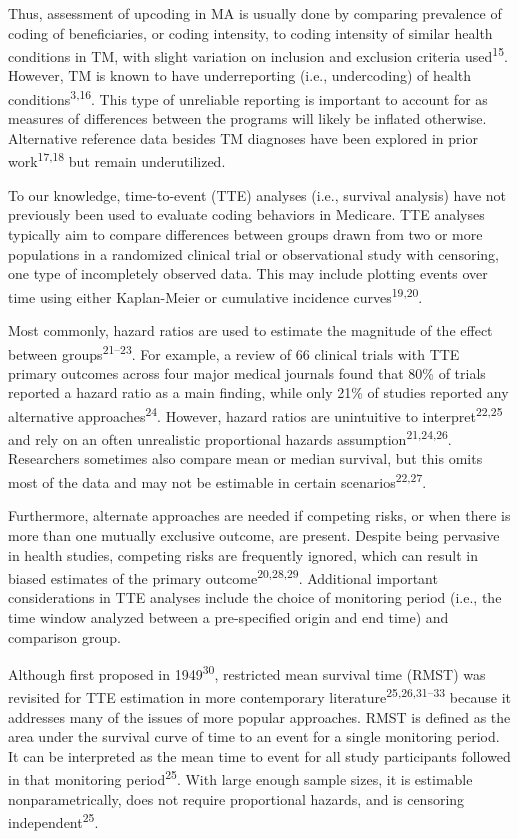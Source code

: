 \documentclass[
  12pt,
  number]{elsarticle}
\begin{document}
Thus, assessment of upcoding in MA is usually done by comparing
prevalence of coding of beneficiaries, or coding intensity, to coding
intensity of similar health conditions in TM, with slight variation on
inclusion and exclusion criteria used\textsuperscript{15}. However, TM
is known to have underreporting (i.e., undercoding) of health
conditions\textsuperscript{3,16}. This type of unreliable reporting is
important to account for as measures of differences between the programs
will likely be inflated otherwise. Alternative reference data besides TM
diagnoses have been explored in prior work\textsuperscript{17,18} but
remain underutilized.

To our knowledge, time-to-event (TTE) analyses (i.e., survival analysis)
have not previously been used to evaluate coding behaviors in Medicare.
TTE analyses typically aim to compare differences between groups drawn
from two or more populations in a randomized clinical trial or
observational study with censoring, one type of incompletely observed
data. This may include plotting events over time using either
Kaplan-Meier or cumulative incidence curves\textsuperscript{19,20}.

Most commonly, hazard ratios are used to estimate the magnitude of the
effect between groups\textsuperscript{21--23}. For example, a review of
66 clinical trials with TTE primary outcomes across four major medical
journals found that 80\% of trials reported a hazard ratio as a main
finding, while only 21\% of studies reported any alternative
approaches\textsuperscript{24}. However, hazard ratios are unintuitive
to interpret\textsuperscript{22,25} and rely on an often unrealistic
proportional hazards assumption\textsuperscript{21,24,26}. Researchers
sometimes also compare mean or median survival, but this omits most of
the data and may not be estimable in certain
scenarios\textsuperscript{22,27}.

Furthermore, alternate approaches are needed if competing risks, or when
there is more than one mutually exclusive outcome, are present. Despite
being pervasive in health studies, competing risks are frequently
ignored, which can result in biased estimates of the primary
outcome\textsuperscript{20,28,29}. Additional important considerations
in TTE analyses include the choice of monitoring period (i.e., the time
window analyzed between a pre-specified origin and end time) and
comparison group.

Although first proposed in 1949\textsuperscript{30}, restricted mean
survival time (RMST) was revisited for TTE estimation in more
contemporary literature\textsuperscript{25,26,31--33} because it
addresses many of the issues of more popular approaches. RMST is defined
as the area under the survival curve of time to an event for a single
monitoring period. It can be interpreted as the mean time to event for
all study participants followed in that monitoring
period\textsuperscript{25}. With large enough sample sizes, it is
estimable nonparametrically, does not require proportional hazards, and
is censoring independent\textsuperscript{25}.
\end{document}
